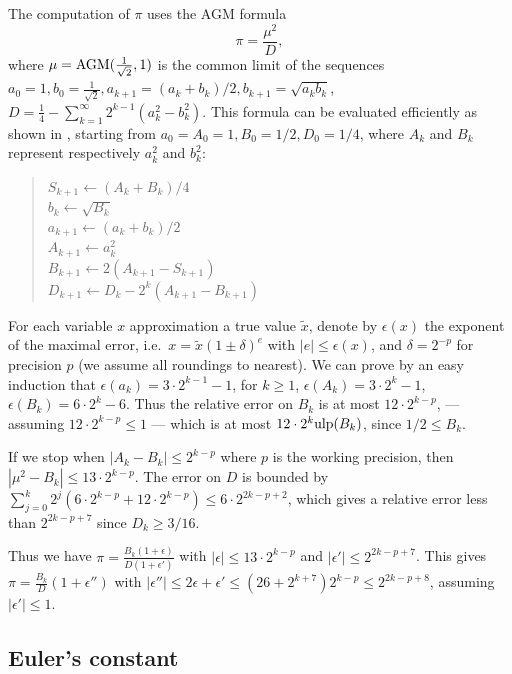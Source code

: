 \documentclass[12pt]{amsart}
\def\ulp{{\rm ulp}}
\begin{document}
The computation of $\pi$ uses the AGM formula
\[ \pi = \frac{\mu^2}{D}, \]
where $\mu = {\rm AGM}(\frac{1}{\sqrt{2}}, 1)$ is the common limit
of the sequences $a_0=1, b_0 = \frac{1}{\sqrt{2}},
a_{k+1} = (a_k+b_k)/2, b_{k+1} = \sqrt{a_k b_k}$,
$D=\frac{1}{4} - \sum_{k=1}^{\infty} 2^{k-1} (a_k^2-b_k^2)$.
This formula can be evaluated efficiently as shown in \cite{ScGrVe94},
starting from $a_0 = A_0 = 1, B_0 = 1/2, D_0 = 1/4$, where $A_k$ and
$B_k$ represent respectively $a_k^2$ and $b_k^2$:
\begin{quote}
$S_{k+1} \leftarrow (A_k + B_k)/4$ \\
$b_k \leftarrow \sqrt{B_k}$ \\
$a_{k+1} \leftarrow (a_k + b_k)/2$ \\
$A_{k+1} \leftarrow a_k^2$ \\
$B_{k+1} \leftarrow 2 (A_{k+1} - S_{k+1})$ \\
$D_{k+1} \leftarrow D_k - 2^k (A_{k+1} - B_{k+1})$
\end{quote}
For each variable $x$ approximation a true value $\tilde{x}$,
denote by $\epsilon(x)$ the exponent of the maximal error,
i.e.\ $x = \tilde{x} (1\pm\delta)^e$ with $|e| \leq \epsilon(x)$,
and $\delta = 2^{-p}$ for precision $p$ (we assume all roundings to
nearest).
We can prove by an easy induction that $\epsilon(a_k) = 3 \cdot 2^{k-1} - 1$,
for $k \geq 1$, $\epsilon(A_k) = 3 \cdot 2^k - 1$,
$\epsilon(B_k) = 6 \cdot 2^k - 6$.
Thus the relative error on $B_k$ is at most $12 \cdot 2^{k-p}$,
--- assuming $12 \cdot 2^{k-p} \leq 1$ ---
which is at most $12 \cdot 2^k \ulp(B_k)$, since $1/2 \leq B_k$.

If we stop when $|A_k-B_k| \leq 2^{k-p}$ where $p$ is the working precision,
then $|\mu^2 - B_k| \leq 13 \cdot 2^{k-p}$.
The error on $D$ is bounded by $\sum_{j=0}^k 2^{j} (6 \cdot 2^{k-p} +
12 \cdot 2^{k-p}) \leq 6 \cdot 2^{2k-p+2}$, which gives a relative error less
than $2^{2k-p+7}$ since $D_k \geq 3/16$.

Thus we have $\pi = \frac{B_k (1+\epsilon)}{D (1+\epsilon')}$
with $|\epsilon| \leq 13 \cdot 2^{k-p}$ and $|\epsilon'| \leq 2^{2k-p+7}$.
This gives $\pi = \frac{B_k}{D} (1+\epsilon'')$ with
$|\epsilon''| \leq 2 \epsilon + \epsilon' \leq (26 + 2^{k+7}) 2^{k-p}
\leq 2^{2k-p+8}$, assuming $|\epsilon'| \leq 1$.

\subsection{Euler's constant} \label{gamma}
\end{document}
